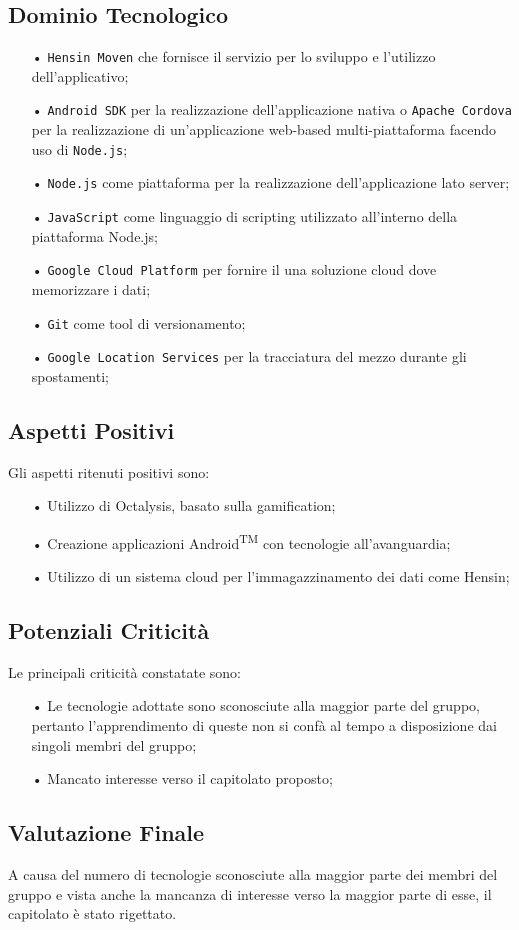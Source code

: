 \subsection{Dominio Tecnologico}
\begin{itemize}
\item[•] \texttt{Hensin Moven} che fornisce il servizio per lo sviluppo e l'utilizzo dell'applicativo;
\item[•] \texttt{Android SDK} per la realizzazione dell'applicazione nativa o \texttt{Apache Cordova} per
 la realizzazione di un'applicazione web-based multi-piattaforma facendo uso di \texttt{Node.js};
\item[•] \texttt{Node.js} come piattaforma per la realizzazione dell'applicazione lato server;
\item[•] \texttt{JavaScript} come linguaggio di scripting utilizzato all'interno della piattaforma Node.js;
\item[•] \texttt{Google Cloud Platform} per fornire il una soluzione cloud dove memorizzare i dati;
\item[•] \texttt{Git} come tool di versionamento;
\item[•] \texttt{Google Location Services} per la tracciatura del mezzo durante gli spostamenti;
\end{itemize}
\subsection{Aspetti Positivi}
Gli aspetti ritenuti positivi sono: 
\begin{itemize}
\item[•] Utilizzo di Octalysis, basato sulla gamification;
\item[•] Creazione applicazioni Android\textsuperscript{TM} con tecnologie all'avanguardia;
\item[•] Utilizzo di un sistema cloud per l'immagazzinamento dei dati come Hensin;
\end{itemize}
\subsection{Potenziali Criticità}
Le principali criticità constatate sono:
\begin{itemize}
\item[•] Le tecnologie adottate sono sconosciute alla maggior parte del gruppo, pertanto l'apprendimento di queste non si confà al tempo a disposizione dai singoli membri del gruppo; 
\item[•] Mancato interesse verso il capitolato proposto;
\end{itemize}
\subsection{Valutazione Finale}
A causa del numero di tecnologie sconosciute alla maggior parte dei membri del gruppo e vista anche la mancanza di interesse verso la maggior parte di esse, il capitolato è stato rigettato.

